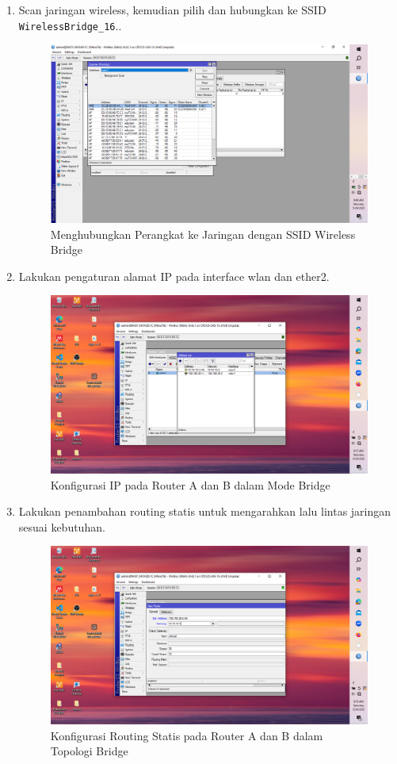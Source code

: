 \begin{enumerate}
    \item Scan jaringan wireless, kemudian pilih dan hubungkan ke SSID \texttt{WirelessBridge\_16}..
    \begin{figure}[H]
        \centering
        \includegraphics[width=0.5\linewidth]{P3/img/gambar3m.png}
        \caption{Menghubungkan Perangkat ke Jaringan dengan SSID Wireless Bridge}
        \label{fig:ssid-bridge}
    \end{figure}

    \item Lakukan pengaturan alamat IP pada interface wlan dan ether2.
    \begin{figure}[H]
        \centering
        \includegraphics[width=0.5\linewidth]{P3/img/gambar4.png}
        \caption{Konfigurasi IP pada Router A dan B dalam Mode Bridge}
        \label{fig:ip-bridge}
    \end{figure}

    \item Lakukan penambahan routing statis untuk mengarahkan lalu lintas jaringan sesuai kebutuhan.
    \begin{figure}[H]
        \centering
        \includegraphics[width=0.5\linewidth]{P3/img/gambar5.png}
        \caption{Konfigurasi Routing Statis pada Router A dan B dalam Topologi Bridge}
        \label{fig:routing-bridge}
    \end{figure}


\end{enumerate}
